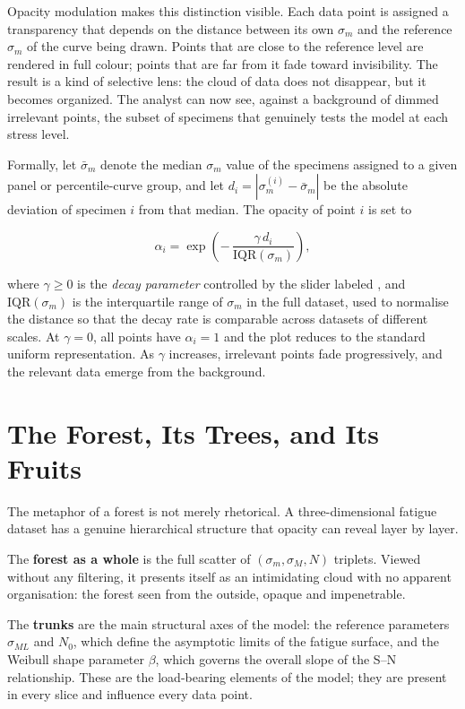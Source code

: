 Opacity modulation makes this distinction visible. Each data point is assigned a transparency that depends on the distance between its own $\sigma_m$ and the reference $\sigma_m$ of the curve being drawn. Points that are close to the reference level are rendered in full colour; points that are far from it fade toward invisibility. The result is a kind of selective lens: the cloud of data does not disappear, but it becomes organized. The analyst can now see, against a background of dimmed irrelevant points, the subset of specimens that genuinely tests the model at each stress level.

Formally, let $\bar\sigma_m$ denote the median $\sigma_m$ value of the specimens assigned to a given panel or percentile-curve group, and let $d_i = |\sigma_m^{(i)} - \bar\sigma_m|$ be the absolute deviation of specimen $i$ from that median. The opacity of point $i$ is set to

\begin{equation}
  \alpha_i = \exp\!\left(-\,\frac{\gamma\, d_i}{\mathrm{IQR}(\sigma_m)}\right),
  \label{eq:opacity}
\end{equation}

\noindent where $\gamma \geq 0$ is the \emph{decay parameter} controlled by the slider labeled , and $\mathrm{IQR}(\sigma_m)$ is the interquartile range of $\sigma_m$ in the full dataset, used to normalise the distance so that the decay rate is comparable across datasets of different scales. At $\gamma = 0$, all points have $\alpha_i = 1$ and the plot reduces to the standard uniform representation. As $\gamma$ increases, irrelevant points fade progressively, and the relevant data emerge from the background.

\section{The Forest, Its Trees, and Its Fruits}

The metaphor of a forest is not merely rhetorical. A three-dimensional fatigue dataset has a genuine hierarchical structure that opacity can reveal layer by layer.

The \textbf{forest as a whole} is the full scatter of $(\sigma_m, \sigma_M, N)$ triplets. Viewed without any filtering, it presents itself as an intimidating cloud with no apparent organisation: the forest seen from the outside, opaque and impenetrable.

The \textbf{trunks} are the main structural axes of the model: the reference parameters $\sigma_{ML}$ and $N_0$, which define the asymptotic limits of the fatigue surface, and the Weibull shape parameter $\beta$, which governs the overall slope of the S--N relationship. These are the load-bearing elements of the model; they are present in every slice and influence every data point.

